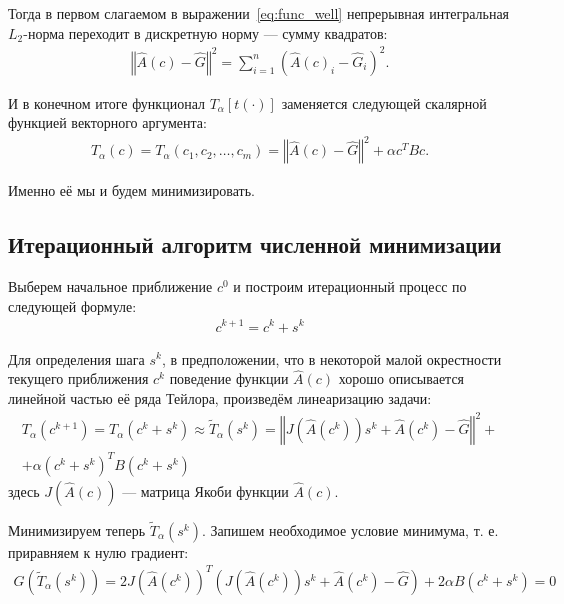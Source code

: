 \documentclass[a4paper,14pt]{extarticle}
\newcommand{\norm}[1]{\left\Vert #1 \right\Vert}
\begin{document}
    Тогда в первом слагаемом в выражении~\eqref{eq:func_well} непрерывная интегральная $L_2$-норма переходит в дискретную норму --- сумму квадратов:
    \begin{gather*}
        \norm{\hat{A}(c) - \hat{G}}^2
        = \sum_{i = 1}^n \left(
        \hat{A}(c)_i
        - \hat{G}_i
        \right)^2.
    \end{gather*}

    И в конечном итоге функционал $T_{\alpha}[t(\cdot)]$ заменяется следующей скалярной функцией векторного аргумента:
    \begin{gather}
        \label{eq:func_discr}
        T_{\alpha}(c)
        = T_{\alpha}(c_1, c_2, \ldots, c_m)
        = \norm{\hat{A}(c) - \hat{G}}^2
        + \alpha  c^{T} B c.
    \end{gather}

    Именно её мы и будем минимизировать.

    \subsection{Итерационный алгоритм численной минимизации}

    Выберем начальное приближение $c^0$ и построим итерационный процесс по следующей формуле:
    \begin{gather*}
        c^{k+1} = c^{k} + s^{k}
    \end{gather*}

    Для определения шага $s^k$, в предположении, что в некоторой малой окрестности текущего приближения $c^k$ поведение функции $\hat{A}(c)$ хорошо описывается линейной частью её ряда Тейлора, произведём линеаризацию задачи:
    \begin{gather*}
        T_{\alpha}(c^{k+1})
        = T_{\alpha}(c^{k} + s^{k})
        \approx \widetilde{T}_{\alpha}(s^{k})
        = \norm{J(\hat{A}(c^k))s^{k} + \hat{A}(c^k) - \hat{G}}^2 + \\
        + \alpha  (c^k + s^{k})^{T} B (c^k + s^{k})
    \end{gather*}
    здесь $J(\hat{A}(c))$ --- матрица Якоби функции $\hat{A}(c)$.

    Минимизируем теперь $\widetilde{T}_{\alpha}(s^{k})$. Запишем необходимое условие минимума, т. е. приравняем к нулю градиент:
    \begin{gather*}
        G(\widetilde{T}_{\alpha}(s^{k}))
        = 2 J(\hat{A}(c^k))^T (J(\hat{A}(c^k))s^{k} + \hat{A}(c^k) - \hat{G})
        + 2 \alpha  B (c^k + s^{k})
        = 0
    \end{gather*}
\end{document}

